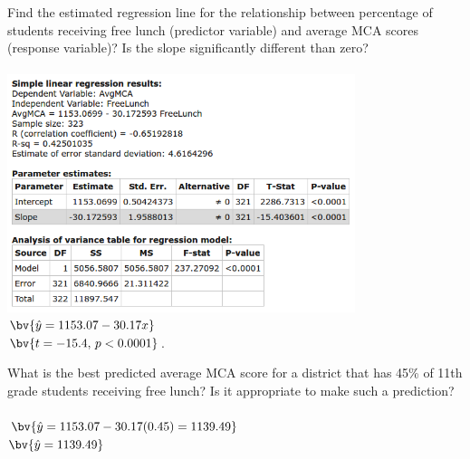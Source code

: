 \documentclass{article}
\begin{document}
\begin{flushleft}
\begin{enumalpha}
\newpage
\item Find the estimated regression line for the relationship between percentage of students receiving free lunch (predictor variable) and average MCA scores (response variable)? Is the slope significantly different than zero?\\
\medskip 
{}\\
\medskip
\includegraphics[width=4in]{images/grp11_Q2_c}\\  
$\bv{\hat y = 1153.07 - 30.17 x}$\\
$\bv{t = -15.4, \, p < 0.0001}$. 
\vspace{.5in}

\item What is the best predicted average MCA score for a district that has 45\% of 11th grade students receiving free lunch? Is it appropriate to make such a prediction?\\
\medskip
{}\\
$\bv{ \hat y = 1153.07 - 30.17 (0.45) = 1139.49}$\\
$\bv{\hat y = 1139.49}$\\
\medskip
{}
\end{enumalpha}


\end{flushleft}
\end{document}
